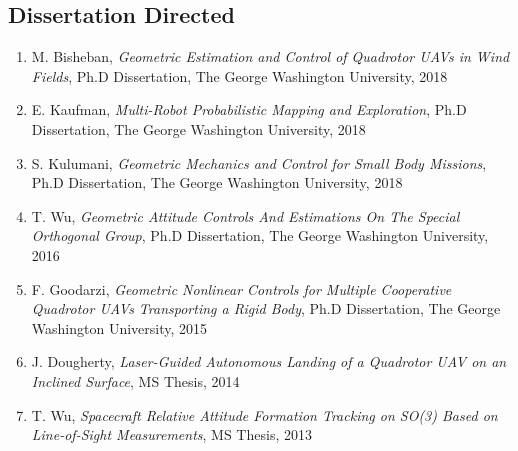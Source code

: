 \documentclass[10pt]{article}
\begin{document}
\vspace*{0.2cm}

\subsection*{Dissertation Directed}
\begin{enumerate}
\renewcommand{\labelenumi}{[\arabic{enumi}]}
\item M. Bisheban, \textit{Geometric Estimation and Control of Quadrotor UAVs in Wind Fields}, Ph.D Dissertation, The George Washington University, 2018
\item E. Kaufman, \textit{Multi-Robot Probabilistic Mapping and Exploration}, Ph.D Dissertation, The George Washington University, 2018
\item S. Kulumani, \textit{Geometric Mechanics and Control for Small Body Missions}, Ph.D Dissertation, The George Washington University, 2018
\item T. Wu, \textit{Geometric Attitude Controls And Estimations On The Special Orthogonal Group}, Ph.D Dissertation, The George Washington University, 2016
\item F. Goodarzi, \textit{Geometric Nonlinear Controls for Multiple Cooperative Quadrotor UAVs Transporting a Rigid Body}, Ph.D Dissertation, The George Washington University, 2015
\item J. Dougherty, \textit{Laser-Guided Autonomous Landing of a Quadrotor UAV on an Inclined Surface}, MS Thesis, 2014
\item T. Wu, \textit{Spacecraft Relative Attitude Formation Tracking on SO(3) Based on Line-of-Sight Measurements}, MS Thesis, 2013
\end{enumerate}

\vspace*{0.2cm}

\setlength{\tabcolsep}{0cm}
\end{document}
